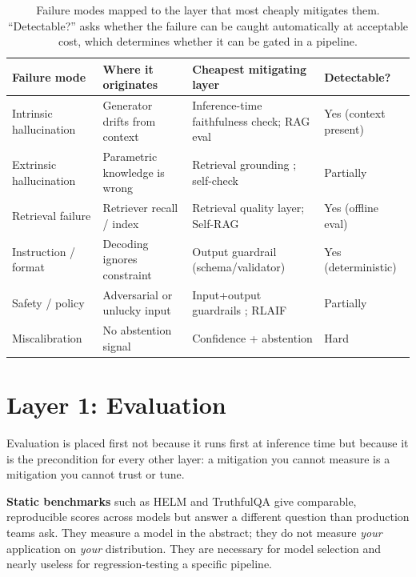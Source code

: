 \documentclass[11pt]{article}
\begin{document}
\begin{table}[t]
\centering
\small
\renewcommand{\arraystretch}{1.25}
\begin{tabular}{@{}L{3.1cm} L{4.3cm} L{4.8cm} L{2.6cm}@{}}
\toprule
\textbf{Failure mode} & \textbf{Where it originates} & \textbf{Cheapest mitigating layer} & \textbf{Detectable?} \\
\midrule
Intrinsic hallucination & Generator drifts from context & Inference-time faithfulness check; RAG eval \citep{es2023ragas} & Yes (context present) \\
Extrinsic hallucination & Parametric knowledge is wrong & Retrieval grounding \citep{lewis2020rag}; self-check \citep{manakul2023selfcheckgpt} & Partially \\
Retrieval failure & Retriever recall / index & Retrieval quality layer; Self-RAG \citep{asai2024selfrag} & Yes (offline eval) \\
Instruction / format & Decoding ignores constraint & Output guardrail (schema/validator) & Yes (deterministic) \\
Safety / policy & Adversarial or unlucky input & Input+output guardrails \citep{rebedea2023nemo}; RLAIF \citep{bai2022constitutional} & Partially \\
Miscalibration & No abstention signal & Confidence + abstention \citep{kadavath2022know} & Hard \\
\bottomrule
\end{tabular}
\caption{Failure modes mapped to the layer that most cheaply mitigates them.
``Detectable?'' asks whether the failure can be caught automatically at
acceptable cost, which determines whether it can be gated in a pipeline.}
\label{tab:failures}
\end{table}

\section{Layer 1: Evaluation}
\label{sec:eval}

Evaluation is placed first not because it runs first at inference time but
because it is the precondition for every other layer: a mitigation you cannot
measure is a mitigation you cannot trust or tune.

\textbf{Static benchmarks} such as HELM \citep{liang2023helm} and TruthfulQA
\citep{lin2022truthfulqa} give comparable, reproducible scores across models but
answer a different question than production teams ask. They measure a model in
the abstract; they do not measure \emph{your} application on \emph{your}
distribution. They are necessary for model selection and nearly useless for
regression-testing a specific pipeline.
\end{document}
